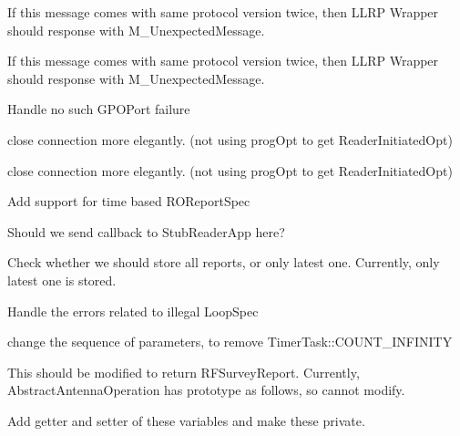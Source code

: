 \begin{DoxyRefList}
If this message comes with same protocol version twice, then L\-L\-R\-P Wrapper should response with M\-\_\-\-Unexpected\-Message. 

If this message comes with same protocol version twice, then L\-L\-R\-P Wrapper should response with M\-\_\-\-Unexpected\-Message.  
\item[\label{todo__todo000014}%
\hypertarget{todo__todo000014}{}%
Member \hyperlink{class_e_l_f_i_n_1_1_l_l_r_p_core_a0065a7307c4ea46db3fea2cd109bc1e1}{E\-L\-F\-I\-N\-:\-:L\-L\-R\-P\-Core\-:\-:handle\-Set\-Reader\-Config} (L\-L\-R\-P\-::\-C\-Message $\ast$\-\_\-p\-Cmd, L\-L\-R\-P\-::\-C\-Message $\ast$$\ast$\-\_\-p\-Rsp)]Handle no such G\-P\-O\-Port failure  
\item[\label{todo__todo000010}%
\hypertarget{todo__todo000010}{}%
Member \hyperlink{class_e_l_f_i_n_1_1_l_l_r_p_core_a7fb97667d470bfddac25da751cf8480e}{E\-L\-F\-I\-N\-:\-:L\-L\-R\-P\-Core\-:\-:run} ()]close connection more elegantly. (not using prog\-Opt to get Reader\-Initiated\-Opt) 

close connection more elegantly. (not using prog\-Opt to get Reader\-Initiated\-Opt)  
\item[\label{todo__todo000017}%
\hypertarget{todo__todo000017}{}%
Member \hyperlink{class_e_l_f_i_n_1_1_reader_operation_a5fe3a421c97daf9cb398d88d79c2b0c1}{E\-L\-F\-I\-N\-:\-:Reader\-Operation\-:\-:handle\-\_\-timeout} (const boost\-::system\-::error\-\_\-code \&e)]Add support for time based R\-O\-Report\-Spec 

Should we send callback to Stub\-Reader\-App here? 

Check whether we should store all reports, or only latest one. Currently, only latest one is stored.  
\item[\label{todo__todo000015}%
\hypertarget{todo__todo000015}{}%
Member \hyperlink{class_e_l_f_i_n_1_1_reader_operation_a0cf397b0aa83e1c5c9df1a1af6a04e93}{E\-L\-F\-I\-N\-:\-:Reader\-Operation\-:\-:Reader\-Operation} (L\-L\-R\-P\-::\-C\-R\-O\-Spec $\ast$a\-R\-O\-Spec, L\-L\-R\-P\-Core $\ast$\-\_\-\-\_\-p\-L\-L\-R\-P\-Core)]Handle the errors related to illegal Loop\-Spec  
\item[\label{todo__todo000016}%
\hypertarget{todo__todo000016}{}%
Member \hyperlink{class_e_l_f_i_n_1_1_reader_operation_af0a5fbd8e670cf99939088f8f8b6582f}{E\-L\-F\-I\-N\-:\-:Reader\-Operation\-:\-:schedule} ()]change the sequence of parameters, to remove Timer\-Task\-::\-C\-O\-U\-N\-T\-\_\-\-I\-N\-F\-I\-N\-I\-T\-Y  
\item[\label{todo__todo000020}%
\hypertarget{todo__todo000020}{}%
Member \hyperlink{class_e_l_f_i_n_1_1_r_f_survey_operation_a7eea340a95a2c04a7a93081354feeaf0}{E\-L\-F\-I\-N\-:\-:R\-F\-Survey\-Operation\-:\-:run} ()]This should be modified to return R\-F\-Survey\-Report. Currently, Abstract\-Antenna\-Operation has prototype as follows, so cannot modify.  
\item[\label{todo__todo000021}%
\hypertarget{todo__todo000021}{}%
Member \hyperlink{class_e_l_f_i_n_1_1_stub_antenna_a83bcedc25647781fa894c00c204b821e}{E\-L\-F\-I\-N\-:\-:Stub\-Antenna\-:\-:\-\_\-p\-Antenna\-I\-D} ]Add getter and setter of these variables and make these private. 
\end{DoxyRefList}